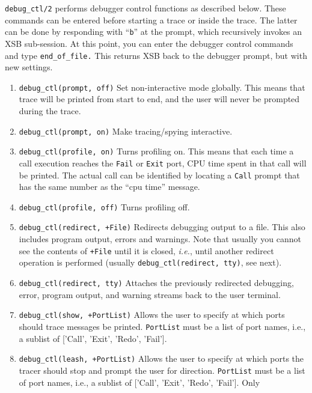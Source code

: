 \begin{description}
   {\tt debug\_ctl/2} performs debugger control functions as described below.
   These commands can be entered before starting a trace or inside the trace.
   The latter can be done by responding with ``{\tt b}'' at the prompt,
   which recursively invokes an XSB sub-session. At this point, you can
   enter the debugger control commands and type \verb|end_of_file.| This
   returns XSB back to the debugger prompt, but with new settings.
   \begin{enumerate}
   \item {\tt debug\_ctl(prompt, off)} Set non-interactive mode globally.
     This means that trace will be printed from start to end, and the user
     will never be prompted during the trace.
    \item {\tt debug\_ctl(prompt, on)} 
      Make tracing/spying interactive.
    \item {\tt debug\_ctl(profile, on)}  
      Turns profiling on. This means that each time a call execution
      reaches the {\tt Fail} or {\tt Exit} port, CPU time spent in that
      call will be printed. The actual call can be identified by locating a
      {\tt Call}  prompt that has the same number as the ``cpu time''
      message.
    \item {\tt debug\_ctl(profile, off)}  
      Turns profiling off.
    \item {\tt debug\_ctl(redirect, +File)} 
      Redirects debugging output to a file. This also includes program output,
      errors and warnings.
      Note that usually you cannot see the contents of {\tt +File} until it
      is closed, {\it i.e.}, until another redirect operation is performed
      (usually {\tt debug\_ctl(redirect, tty)}, see next).
    \item {\tt debug\_ctl(redirect, tty)}     
      Attaches the previously redirected debugging, error, program output,
      and warning streams back to the user terminal.
    \item {\tt debug\_ctl(show, +PortList)}  
      Allows the user to specify at which ports should trace messages be
      printed. {\tt PortList} must be a list of port names, i.e., a sublist
      of ['Call', 'Exit', 'Redo', 'Fail']. 
    \item {\tt debug\_ctl(leash, +PortList)}  
      Allows the user to specify at which ports the tracer should stop
      and prompt the user for direction.  {\tt PortList} must be a list of
      port names, i.e., a sublist of ['Call', 'Exit', 'Redo', 'Fail'].  Only

\end{enumerate}
\end{description}
